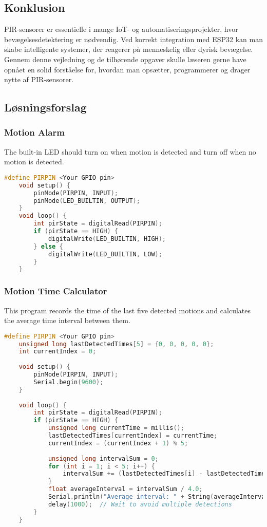 \subsection*{Konklusion}
PIR-sensorer er essentielle i mange IoT- og automatiseringsprojekter, hvor bevægelsesdetektering er nødvendig. Ved korrekt integration med ESP32 kan man skabe intelligente systemer, der reagerer på menneskelig eller dyrisk bevægelse. Gennem denne vejledning og de tilhørende opgaver skulle læseren gerne have opnået en solid forståelse for, hvordan man opsætter, programmerer og drager nytte af PIR-sensorer.

\clearpage

\subsection*{Løsningsforslag}

\subsubsection*{Motion Alarm}
The built-in LED should turn on when motion is detected and turn off when no motion is detected.
\begin{lstlisting}[language=C++]
	#define PIRPIN <Your GPIO pin>
	void setup() {
		pinMode(PIRPIN, INPUT);
		pinMode(LED_BUILTIN, OUTPUT);
	}
	void loop() {
		int pirState = digitalRead(PIRPIN);
		if (pirState == HIGH) {
			digitalWrite(LED_BUILTIN, HIGH);
		} else {
			digitalWrite(LED_BUILTIN, LOW);
		}
	}
\end{lstlisting}

\subsubsection*{Motion Time Calculator}
This program records the time of the last five detected motions and calculates the average time interval between them.
\begin{lstlisting}[language=C++]
	#define PIRPIN <Your GPIO pin>
	unsigned long lastDetectedTimes[5] = {0, 0, 0, 0, 0};
	int currentIndex = 0;
	
	void setup() {
		pinMode(PIRPIN, INPUT);
		Serial.begin(9600);
	}
	
	void loop() {
		int pirState = digitalRead(PIRPIN);
		if (pirState == HIGH) {
			unsigned long currentTime = millis();
			lastDetectedTimes[currentIndex] = currentTime;
			currentIndex = (currentIndex + 1) % 5;
			
			unsigned long intervalSum = 0;
			for (int i = 1; i < 5; i++) {
				intervalSum += (lastDetectedTimes[i] - lastDetectedTimes[i - 1]);
			}
			float averageInterval = intervalSum / 4.0;
			Serial.println("Average interval: " + String(averageInterval) + " ms");
			delay(1000);  // Wait to avoid multiple detections
		}
	}
\end{lstlisting}

